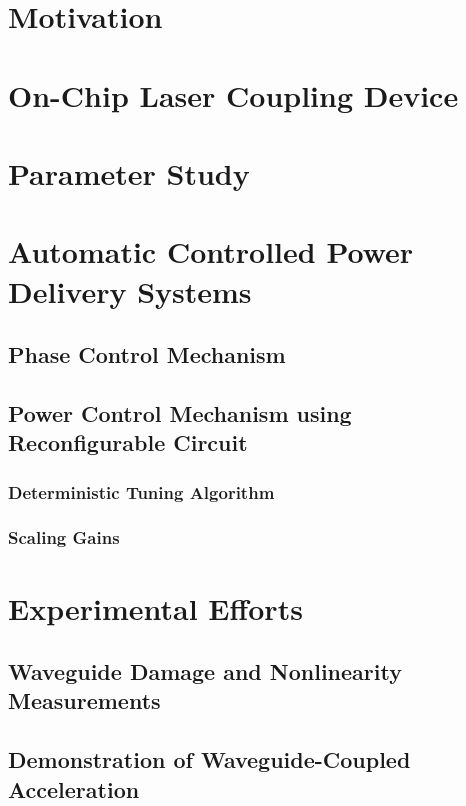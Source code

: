 \section{Motivation}

\section{On-Chip Laser Coupling Device}

\section{Parameter Study}

\section{Automatic Controlled Power Delivery Systems}

\subsection{Phase Control Mechanism}

\subsection{Power Control Mechanism using Reconfigurable Circuit}

\subsubsection{Deterministic Tuning Algorithm}

\subsubsection{Scaling Gains}

\section{Experimental Efforts}

\subsection{Waveguide Damage and Nonlinearity Measurements}

\subsection{Demonstration of Waveguide-Coupled Acceleration}
